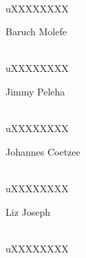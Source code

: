 \documentclass[a4paper,12pt]{report}
\begin{document}
\begin{titlepage}
\begin{center}
\begin{minipage}{0.4\textwidth}
\end{minipage}
\begin{minipage}{0.4\textwidth}
\begin{flushright} \large
\emph{} \\
uXXXXXXXX
\end{flushright}
\end{minipage}
\begin{minipage}{0.4\textwidth}
\begin{flushleft} \large
Baruch {Molefe}
\end{flushleft}
\end{minipage}
\begin{minipage}{0.4\textwidth}
\begin{flushright} \large
\emph{} \\
uXXXXXXXX
\end{flushright}
\end{minipage}
\begin{minipage}{0.4\textwidth}
\begin{flushleft} \large
Jimmy {Peleha}
\end{flushleft}
\end{minipage}
\begin{minipage}{0.4\textwidth}
\begin{flushright} \large
\emph{} \\
uXXXXXXXX
\end{flushright}
\end{minipage}
\begin{minipage}{0.4\textwidth}
\begin{flushleft} \large
Johannes {Coetzee}
\end{flushleft}
\end{minipage}
\begin{minipage}{0.4\textwidth}
\begin{flushright} \large
\emph{} \\
uXXXXXXXX
\end{flushright}
\end{minipage}
\begin{minipage}{0.4\textwidth}
\begin{flushleft} \large
Liz {Joseph}
\end{flushleft}
\end{minipage}
\begin{minipage}{0.4\textwidth}
\begin{flushright} \large
\emph{} \\
uXXXXXXXX
\end{flushright}

\end{minipage}
\end{center}
\end{titlepage}
\end{document}
